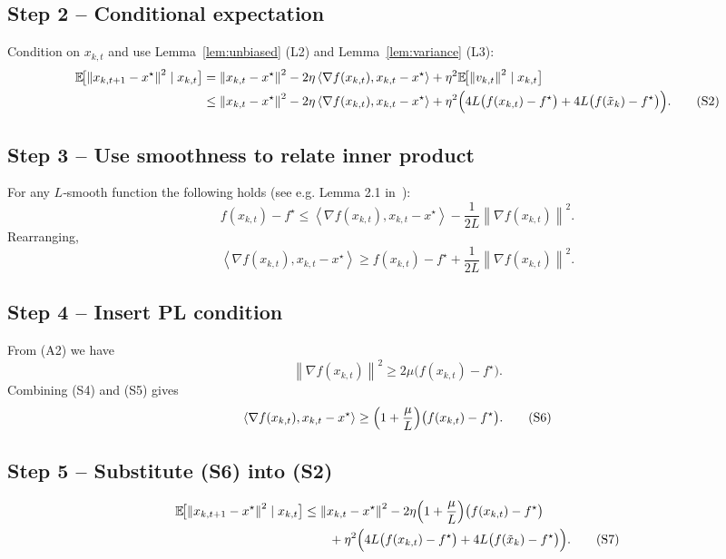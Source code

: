 \documentclass{article}
\newcommand{\EE}{\mathbb{E}}
\newcommand{\norm}[1]{\left\|#1\right\|}
\newcommand{\inner}[2]{\left\langle #1,#2\right\rangle}
\begin{document}
\subsection*{Step 2 – Conditional expectation}
Condition on $x_{k,t}$ and use Lemma~\ref{lem:unbiased} (L2) and Lemma~\ref{lem:variance}
(L3):
\[
\begin{aligned}
\EE\!\bigl[\norm{x_{k,t+1}-x^{\star}}^2\mid x_{k,t}\bigr]
&=\norm{x_{k,t}-x^{\star}}^2
   -2\eta\inner{\nabla f(x_{k,t})}{x_{k,t}-x^{\star}}
   +\eta^2\EE\!\bigl[\norm{v_{k,t}}^2\mid x_{k,t}\bigr] \\
&\le \norm{x_{k,t}-x^{\star}}^2
   -2\eta\inner{\nabla f(x_{k,t})}{x_{k,t}-x^{\star}}
   +\eta^2\Bigl(4L\bigl(f(x_{k,t})-f^{\star}\bigr)
               +4L\bigl(f(\tilde x_k)-f^{\star}\bigr)\Bigr). \tag{S2}
\end{aligned}
\]

\subsection*{Step 3 – Use smoothness to relate inner product}
For any $L$‑smooth function the following holds (see e.g. Lemma 2.1 in~\cite{Nesterov2004}):
\[
f(x_{k,t})-f^{\star}
\le \inner{\nabla f(x_{k,t})}{x_{k,t}-x^{\star}}
   -\frac{1}{2L}\norm{\nabla f(x_{k,t})}^2 . \tag{S3}
\]
Rearranging,
\[
\inner{\nabla f(x_{k,t})}{x_{k,t}-x^{\star}}
\ge f(x_{k,t})-f^{\star}
   +\frac{1}{2L}\norm{\nabla f(x_{k,t})}^2 . \tag{S4}
\]

\subsection*{Step 4 – Insert PL condition}
From (A2) we have
\[
\norm{\nabla f(x_{k,t})}^2\ge 2\mu\bigl(f(x_{k,t})-f^{\star}\bigr). \tag{S5}
\]
Combining (S4) and (S5) gives
\[
\inner{\nabla f(x_{k,t})}{x_{k,t}-x^{\star}}
\ge \Bigl(1+\frac{\mu}{L}\Bigr)\bigl(f(x_{k,t})-f^{\star}\bigr). \tag{S6}
\]

\subsection*{Step 5 – Substitute (S6) into (S2)}
\[
\begin{aligned}
\EE\!\bigl[\norm{x_{k,t+1}-x^{\star}}^2\mid x_{k,t}\bigr]
&\le \norm{x_{k,t}-x^{\star}}^2
   -2\eta\Bigl(1+\frac{\mu}{L}\Bigr)\bigl(f(x_{k,t})-f^{\star}\bigr) \\
&\qquad +\eta^2\Bigl(4L\bigl(f(x_{k,t})-f^{\star}\bigr)
               +4L\bigl(f(\tilde x_k)-f^{\star}\bigr)\Bigr). \tag{S7}
\end{aligned}
\]
\end{document}
